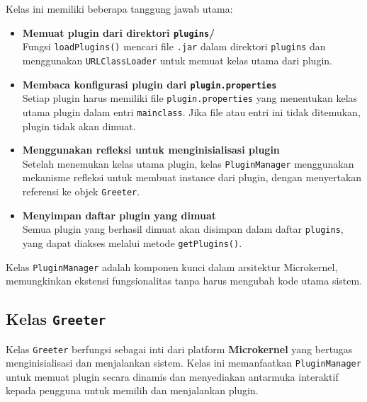 Kelas ini memiliki beberapa tanggung jawab utama:

\begin{itemize}
	\item \textbf{Memuat plugin dari direktori \texttt{plugins}/} \\
	Fungsi \texttt{loadPlugins()} mencari file \texttt{.jar} dalam direktori \texttt{plugins} dan menggunakan \texttt{URLClassLoader} untuk memuat kelas utama dari plugin.
	
	\item \textbf{Membaca konfigurasi plugin dari \texttt{plugin.properties}} \\
	Setiap plugin harus memiliki file \texttt{plugin.properties} yang menentukan kelas utama plugin dalam entri \texttt{mainclass}. Jika file atau entri ini tidak ditemukan, plugin tidak akan dimuat.
	
	\item \textbf{Menggunakan refleksi untuk menginisialisasi plugin} \\
	Setelah menemukan kelas utama plugin, kelas \texttt{PluginManager} menggunakan mekanisme refleksi untuk membuat instance dari plugin, dengan menyertakan referensi ke objek \texttt{Greeter}.
	
	\item \textbf{Menyimpan daftar plugin yang dimuat} \\
	Semua plugin yang berhasil dimuat akan disimpan dalam daftar \texttt{plugins}, yang dapat diakses melalui metode \texttt{getPlugins()}.
\end{itemize}

Kelas \texttt{PluginManager} adalah komponen kunci dalam arsitektur Microkernel, memungkinkan ekstensi fungsionalitas tanpa harus mengubah kode utama sistem.

\subsection{Kelas \texttt{Greeter}}

Kelas \texttt{Greeter} berfungsi sebagai inti dari platform \textbf{Microkernel} yang bertugas menginisialisasi dan menjalankan sistem. Kelas ini memanfaatkan \texttt{PluginManager} untuk memuat plugin secara dinamis dan menyediakan antarmuka interaktif kepada pengguna untuk memilih dan menjalankan plugin.

